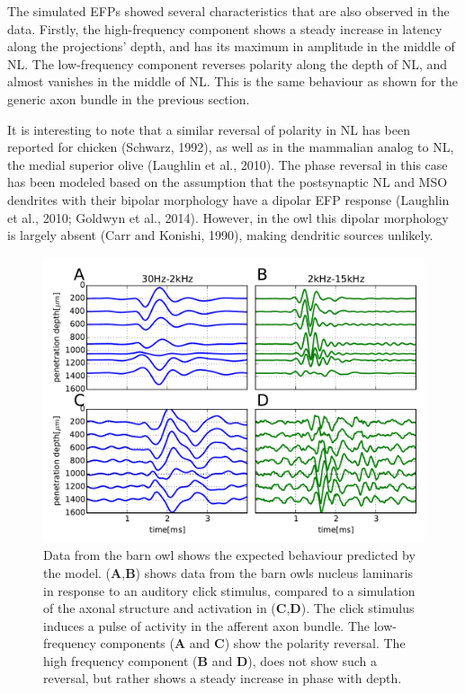 \documentclass[]{article}
\begin{document}
The simulated EFPs showed several characteristics that are also observed
in the data. Firstly, the high-frequency component shows a steady
increase in latency along the projections' depth, and has its maximum in
amplitude in the middle of NL. The low-frequency component reverses
polarity along the depth of NL, and almost vanishes in the middle of NL.
This is the same behaviour as shown for the generic axon bundle in the
previous section.

It is interesting to note that a similar reversal of polarity in NL has
been reported for chicken (Schwarz, 1992), as well as in the mammalian
analog to NL, the medial superior olive (Laughlin et al., 2010). The
phase reversal in this case has been modeled based on the assumption
that the postsynaptic NL and MSO dendrites with their bipolar morphology
have a dipolar EFP response (Laughlin et al., 2010; Goldwyn et al.,
2014). However, in the owl this dipolar morphology is largely absent
(Carr and Konishi, 1990), making dendritic sources unlikely.

\begin{figure}[htbp]
\centering
\includegraphics{../figs/fig_3.pdf}
\caption{Data from the barn owl shows the expected behaviour predicted
by the model. (\textbf{A},\textbf{B}) shows data from the barn owls
nucleus laminaris in response to an auditory click stimulus, compared to
a simulation of the axonal structure and activation in
(\textbf{C},\textbf{D}). The click stimulus induces a pulse of activity
in the afferent axon bundle. The low-frequency components (\textbf{A}
and \textbf{C}) show the polarity reversal. The high frequency component
(\textbf{B} and \textbf{D}), does not show such a reversal, but rather
shows a steady increase in phase with depth.}
\end{figure}
\end{document}
